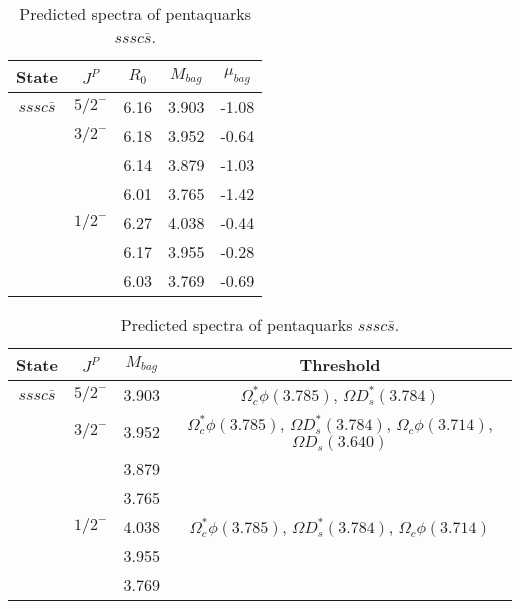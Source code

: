 \documentclass[prd,twocolumn,floatfix,nofootinbib]{revtex4}
\begin{document}
\renewcommand{\tabcolsep}{0.5cm}
\renewcommand{\arraystretch}{1.2}
\begin{table*}[!htbp]
    \caption{Predicted spectra of pentaquarks $sssc\bar{s}$.}
    \begin{tabular}{ccccc}
        \hline\hline
        {\rm State} &$J^{P}$ &$R_{0}$ &$M_{bag}$ &$\mu_{bag}$ \\ \hline
        $sssc\bar{s}$
            &${5/2}^{-}$    &6.16   &3.903  &-1.08 \\
            &${3/2}^{-}$    &6.18   &3.952  &-0.64 \\
            &               &6.14   &3.879  &-1.03 \\
            &               &6.01   &3.765  &-1.42 \\
            &${1/2}^{-}$    &6.27   &4.038  &-0.44 \\
            &               &6.17   &3.955  &-0.28 \\
            &               &6.03   &3.769  &-0.69 \\
        \hline\hline
    \end{tabular}
\end{table*}

\renewcommand{\tabcolsep}{0.5cm}
\renewcommand{\arraystretch}{1.2}
\begin{table*}[!htbp]
    \caption{Predicted spectra of pentaquarks $sssc\bar{s}$.}
    \begin{tabular}{cccc}
        \hline\hline
        {\rm State} &$J^{P}$ &$M_{bag}$ &Threshold \\ \hline
        $sssc\bar{s}$
            &${5/2}^{-}$    &3.903  &$\Omega_{c}^{\ast}\phi(3.785)$, $\Omega D_{s}^{\ast}(3.784)$ \\
            &${3/2}^{-}$    &3.952  &$\Omega_{c}^{\ast}\phi(3.785)$, $\Omega D_{s}^{\ast}(3.784)$, $\Omega_{c}\phi(3.714)$, $\Omega D_{s}(3.640)$ \\
            &               &3.879  & \\
            &               &3.765  & \\
            &${1/2}^{-}$    &4.038  &$\Omega_{c}^{\ast}\phi(3.785)$, $\Omega D_{s}^{\ast}(3.784)$, $\Omega_{c}\phi(3.714)$ \\
            &               &3.955  & \\
            &               &3.769  & \\
        \hline\hline
    \end{tabular}
\end{table*}
\end{document}
